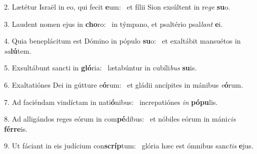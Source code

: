 2. Lætétur Israël in eo, qui fecit \textbf{e}um: \ast\  et fílii Sion exsúltent in re\textit{ge} \textbf{su}o.\

3. Laudent nomen ejus in \textbf{cho}ro: \ast\  in týmpano, et psaltério psal\textit{lant} \textbf{e}i.\

4. Quia beneplácitum est Dómino in pópulo \textbf{su}o: \ast\  et exaltábit mansuétos in \textit{sa}\textbf{lú}tem.\

5. Exsultábunt sancti in \textbf{gló}ria: \ast\  lætabúntur in cubíli\textit{bus} \textbf{su}is.\

6. Exaltatiónes Dei in gútture e\textbf{ó}rum: \ast\  et gládii ancípites in mánibus \textit{e}\textbf{ó}rum.\

7. Ad faciéndam vindíctam in nati\textbf{ó}nibus: \ast\  increpatiónes \textit{in} \textbf{pó}\textbf{pu}lis.\

8. Ad alligándos reges eórum in com\textbf{pé}dibus: \ast\  et nóbiles eórum in máni\textit{cis} \textbf{fér}\textbf{re}is.\

9. Ut fáciant in eis judícium con\textbf{scríp}tum: \ast\  glória hæc est ómnibus sanc\textit{tis} \textbf{e}jus.\

